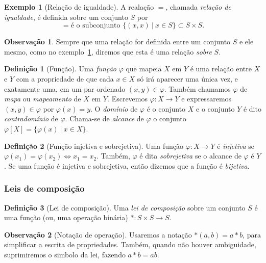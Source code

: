 \documentclass[a4paper,12pt]{report}
\theoremstyle{plain}
\theoremstyle{definition}
\newtheorem{definicao}{Definição}[section]
\newtheorem{observacao}{Observação}[section]
\newtheorem{exemplo}{Exemplo}[section]
\begin{document}
	\begin{exemplo}[Relação de igualdade]\label{ex:igualdade}
		A realação $=$, chamada \emph{relação de igualdade}, é definida sobre um conjunto $S$ por $$= \text{é o subconjunto } \{(x,x) \ |\ x\in S\}\subset S\times S.$$
	\end{exemplo}
	
	\begin{observacao}
		Sempre que uma relação for definida entre um conjunto $S$ e ele mesmo, como no exemplo~\ref{ex:igualdade}, diremos que esta é uma relação \emph{sobre} $S$.
	\end{observacao}
	
	\begin{definicao}[Função]
			Uma \emph{função} $\varphi$ que mapeia $X$ em $Y$ é uma relação entre $X$ e $Y$ com a propriedade de que cada $x\in X$ só irá aparecer uma única vez, e exatamente uma, em um par ordenado $(x,y)\in \varphi$. Também chamamos $\varphi$ de \emph{mapa} ou \emph{mapeamento} de $X$ em $Y$. Escrevemos $\varphi: X\longrightarrow Y$ e expressaremos $(x,y)\in\varphi$ por $\varphi(x) = y$. O \emph{domínio} de $\varphi$ é o conjunto $X$ e o conjunto $Y$ é dito \emph{contradomínio} de $\varphi$. Chama-se de \emph{alcance} de $\varphi$ o conjunto $\varphi[X] = \{\varphi(x)\ | \ x \in X\}.$
	\end{definicao}
	
	\begin{definicao}[Função injetiva e sobrejetiva]
			Uma função $\varphi: X \longrightarrow Y$ é \emph{injetiva} se $\varphi(x_1) = \varphi(x_2) \iff x_1 = x_2$. Também, $\varphi$ é dita \emph{sobrejetiva} se o alcance de $\varphi$ é $Y$. Se uma função é injetiva e sobrejetiva, então dizemos que a função é \emph{bijetiva}.
	\end{definicao}
	
	\subsubsection*{Leis de composição}
	
	\begin{definicao}[Lei de composição]
		Uma \emph{lei de composição} sobre um conjunto \(S\) é uma função (ou, uma operação binária) \(*: S\times S \longrightarrow S\).
	\end{definicao}
	
	\begin{observacao}[Notação de operação]
		Usaremos a notação \(*(a,b) = a*b\), para simplificar a escrita de
		propriedades. Também, quando não houver ambiguidade, suprimiremos o simbolo da lei, fazendo $a*b = ab$.
	\end{observacao}
	
\end{document}
